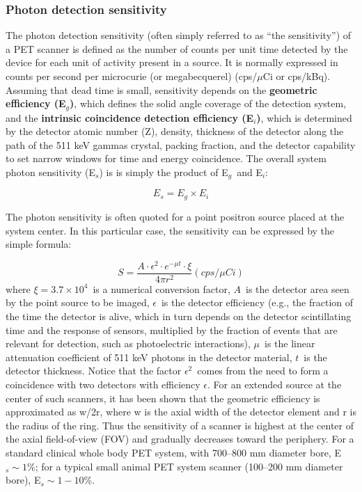 \subsubsection*{Photon detection sensitivity}

The photon detection sensitivity (often simply referred to as ``the sensitivity'') of a PET scanner is defined as the number of counts per unit time detected by the device for each unit of activity present in a source. It is normally expressed in counts per second per microcurie (or megabecquerel) (cps/$\mu$Ci or cps/kBq). 
Assuming that dead time is small, sensitivity depends on the 
{\bf geometric efficiency (E$_g$)}, which defines the solid angle coverage of the detection system, and the {\bf intrinsic coincidence detection efficiency (E$_i$)},
which is determined by the detector atomic
number (Z), density, thickness of the detector along the path of the 511 keV gammas crystal, packing fraction, and the detector capability to set narrow windows for time and energy coincidence. The overall system
photon sensitivity (E$_s$) is is simply the product of E$_g$~and E$_i$:

%
\begin{equation}
E_s = E_g \times E_i
\label{eq.gsensi}
\end{equation}

The photon sensitivity is often quoted for a
point positron source placed at the system center. In this particular case, the sensitivity can be expressed by the simple formula:

\begin{equation}
S = \frac{A \cdot \epsilon^2 \cdot e^{-\mu t} \cdot \xi}{4 \pi r^2} (cps/\mu Ci)
\label{eq.sensi}
\end{equation}
%
where $\xi = 3.7 \times 10^4$~is a numerical conversion factor, $A$~is the detector area seen by the point source to be imaged, $\epsilon$~is the detector efficiency (e.g., the fraction of the time the detector is alive, which in turn depends on the detector scintillating time and the response of sensors, multiplied by the fraction of events that are relevant for detection, such as photoelectric interactions), $\mu$~is the linear attenuation coefficient of 511 keV photons in the detector material, $t$~is the detector thickness. Notice that the factor $\epsilon^2$~comes from the need to form a coincidence with two detectors with efficiency $\epsilon$. For an extended source at the center of such scanners, it has been shown that the geometric efficiency is approximated as w/2r, where w is the axial width of the detector element and r is the radius of the ring. Thus the sensitivity of a scanner is highest at the center of the axial field-of-view (FOV) and gradually decreases toward the periphery.
For a standard clinical whole body PET
system, with 700--800 mm diameter bore, E$_s \sim 1$\%; for a typical
small animal PET system scanner (100--200 mm diameter bore), E$_s \sim 1-10$\%.

